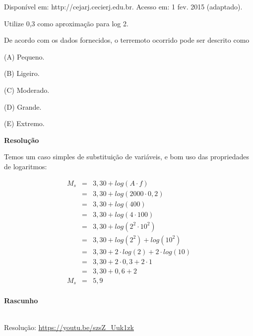{\scriptsize 
    \begin{flushright}
        Disponível em: http://cejarj.cecierj.edu.br. Acesso em: 1 fev. 2015 (adaptado). 
    \end{flushright}
}

Utilize 0,3 como aproximação para log 2. 

De acordo com os dados fornecidos, o terremoto ocorrido pode ser descrito como

(A) Pequeno.

(B) Ligeiro.

(C) Moderado.

(D) Grande.

(E) Extremo.



\textbf{Resolução}

Temos um caso simples de substituição de variáveis, e bom uso das propriedades de logaritmos:


\begin{eqnarray*}
    M_{s} 	&=& 3,30 + log(A \cdot f) \\
            &=& 3,30 + log(2000 \cdot 0,2) \\
            &=& 3,30 + log(400) \\
            &=& 3,30 + log(4 \cdot 100) \\
            &=& 3,30 + log(2^{2} \cdot 10^{2}) \\
            &=& 3,30 + log(2^{2}) + log(10^{2}) \\
            &=& 3,30 + 2 \cdot log(2) + 2 \cdot log(10) \\
            &=& 3,30 + 2 \cdot 0,3 + 2 \cdot 1 \\
            &=& 3,30 + 0,6 + 2 \\
      M_{s} &=& 5,9 \\
\end{eqnarray*}


\textbf{Rascunho}

\qquad



\begin{center}
    \href{https://youtu.be/S22SHYt4n-o}{
    }\\
    Resolução: \url{https://youtu.be/szsZ_Uuk1zk}
\end{center}



